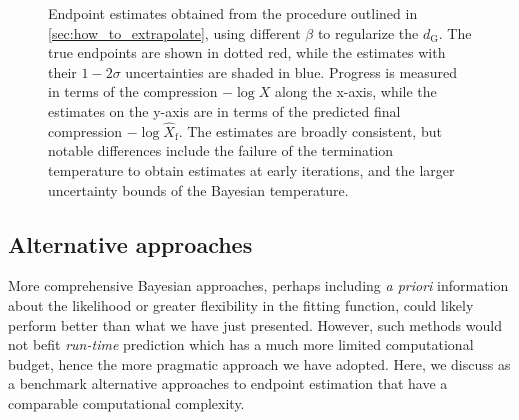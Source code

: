 \documentclass[usenatbib]{mnras}
\newcommand{\dG}{d_\mathrm{G}}
\begin{document}
\begin{figure}
\newline
{}
\newline
{}
\caption{Endpoint estimates obtained from the procedure outlined in \cref{sec:how_to_extrapolate}, using different $\beta$ to regularize the $\dG$. The true endpoints are shown in dotted red, while the estimates with their $1-2\sigma$ uncertainties are shaded in blue. Progress is measured in terms of the compression $-\log X$ along the x-axis, while the estimates on the y-axis are in terms of the predicted final compression $-\log \hat{X}_\mathrm{f}$. The estimates are broadly consistent, but notable differences include the failure of the termination temperature to obtain estimates at early iterations, and the larger uncertainty bounds of the Bayesian temperature.}
\label{fig:beta_endpoint_comparison}
\end{figure}



\subsection{Alternative approaches}
More comprehensive Bayesian approaches, perhaps including \textit{a priori} information about the likelihood or greater flexibility in the fitting function, could likely perform better than what we have just presented. However, such methods would not befit \textit{run-time} prediction which has a much more limited computational budget, hence the more pragmatic approach we have adopted. Here, we discuss as a benchmark alternative approaches to endpoint estimation that have a comparable computational complexity.
\end{document}
